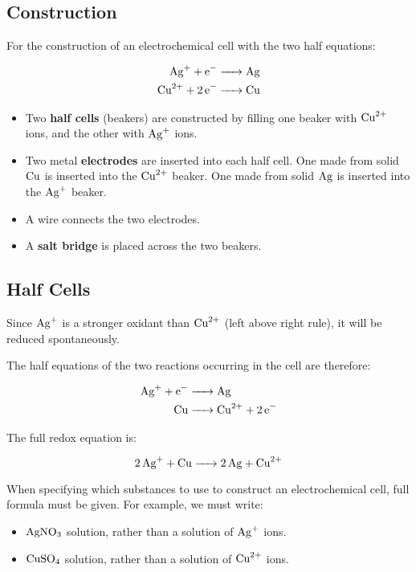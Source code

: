 \documentclass[a4paper,11pt]{article}
\begin{document}
\subsection{Construction}


For the construction of an electrochemical cell with the two half equations:

$$
\begin{aligned}
\ce{Ag+ + e- & -> Ag} \\
\ce{Cu^{2+} + 2e- & -> Cu} \\
\end{aligned}
$$

\begin{itemize}
\item Two \textbf{half cells} (beakers) are constructed by filling one beaker
	with $\ce{Cu^{2+}}$ ions, and the other with $\ce{Ag+}$ ions.
\item Two metal \textbf{electrodes} are inserted into each half cell. One made
	from solid $\ce{Cu}$ is inserted into the $\ce{Cu^{2+}}$ beaker. One made
	from solid $\ce{Ag}$ is inserted into the $\ce{Ag+}$ beaker.
\item A wire connects the two electrodes.
\item A \textbf{salt bridge} is placed across the two beakers.
\end{itemize}

\subsection{Half Cells}

Since $\ce{Ag+}$ is a stronger oxidant than $\ce{Cu^{2+}}$ (left above right
rule), it will be reduced spontaneously.

The half equations of the two reactions occurring in the cell are therefore:

$$
\begin{aligned}
\ce{Ag+ + e- & -> Ag} \\
\ce{Cu & -> Cu^{2+} + 2e-} \\
\end{aligned}
$$

The full redox equation is:

$$
\ce{2Ag+ + Cu -> 2Ag + Cu^{2+}}
$$

When specifying which substances to use to construct an electrochemical cell,
full formula must be given. For example, we must write:

\begin{itemize}
\item $\ce{AgNO3}$ solution, rather than a solution of $\ce{Ag+}$ ions.
\item $\ce{CuSO4}$ solution, rather than a solution of $\ce{Cu^{2+}}$ ions.
\end{itemize}
\end{document}
